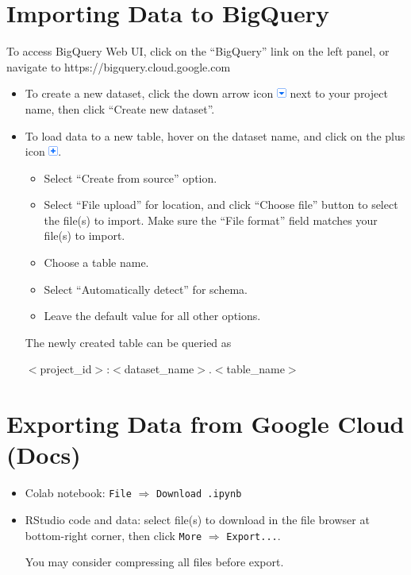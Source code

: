 \section*{Importing Data to BigQuery}
To access BigQuery Web UI, click on the ``BigQuery'' link on the left panel, or
navigate to https://bigquery.cloud.google.com
\begin{itemize}
\item To create a new dataset, click the down arrow icon
  \includegraphics{../arrow.png} next to your project name,
  then click ``Create new dataset''.
\item To load data to a new table, hover on the dataset name, and click on the
  plus icon \includegraphics{../plus.png}.
  \begin{itemize}
  \item Select ``Create from source'' option.
  \item Select ``File upload'' for location, and click ``Choose file'' button to
    select the file(s) to import. Make sure the ``File format'' field matches
    your file(s) to import.
  \item Choose a table name.
  \item Select ``Automatically detect'' for schema.
  \item Leave the default value for all other options.
  \end{itemize}
  The newly created table can be queried as
  \begin{center}
    $<$project\_id$>$:$<$dataset\_name$>$.$<$table\_name$>$
  \end{center}
\end{itemize}
\section*{Exporting Data from Google Cloud (Docs)}
\begin{itemize}
\item Colab notebook: \texttt{File} $\Rightarrow$ \texttt{Download .ipynb}
\item RStudio code and data: select file(s) to download in the file browser
  at bottom-right corner, then click \texttt{More} $\Rightarrow$
  \texttt{Export...}.

  You may consider compressing all files before export.
\end{itemize}

\newpage
